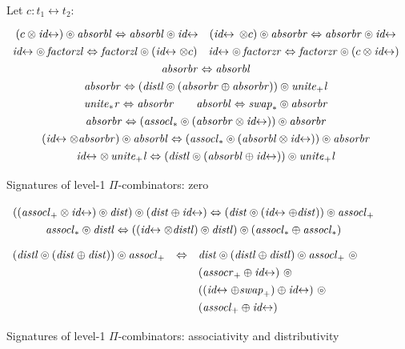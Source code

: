 \documentclass{article}
\newcommand{\identlp}{\mathit{unite}_+\mathit{l}}
\newcommand{\swapp}{\mathit{swap}_+}
\newcommand{\assoclp}{\mathit{assocl}_+}
\newcommand{\assocrp}{\mathit{assocr}_+}
\newcommand{\identlst}{\mathit{unite}_*\mathit{r}}
\newcommand{\swapt}{\mathit{swap}_*}
\newcommand{\assoclt}{\mathit{assocl}_*}
\newcommand{\absorbr}{\mathit{absorbr}}
\newcommand{\absorbl}{\mathit{absorbl}}
\newcommand{\factorzr}{\mathit{factorzr}}
\newcommand{\factorzl}{\mathit{factorzl}}
\newcommand{\dist}{\mathit{dist}}
\newcommand{\distl}{\mathit{distl}}
\newcommand{\idc}{\mathit{id}\!\!\leftrightarrow}
\begin{document}
\begin{figure}[t]
Let $c : t_1 \leftrightarrow t_2$:
\[\def\arraystretch{1.3}
\begin{array}{c}
  {(c \otimes \idc) \circledcirc \absorbl \Leftrightarrow \absorbl \circledcirc \idc}
\quad
  {(\idc \, \otimes c) \circledcirc \absorbr \Leftrightarrow \absorbr \circledcirc \idc}
\\
  {\idc \circledcirc \, \factorzl \Leftrightarrow \factorzl \circledcirc (\idc \otimes c)}
\quad
  {\idc \circledcirc \, \factorzr \Leftrightarrow \factorzr \circledcirc (c \otimes \idc)}
\\
  {\absorbr \Leftrightarrow \absorbl}
\\
  {\absorbr \Leftrightarrow (\distl \circledcirc (\absorbr \oplus \absorbr)) \circledcirc \identlp}
\\
  {\identlst \Leftrightarrow \absorbr}
\qquad
  {\absorbl \Leftrightarrow \swapt \circledcirc \absorbr}
\\
  {\absorbr \Leftrightarrow (\assoclt \circledcirc (\absorbr \otimes \idc)) \circledcirc \absorbr}
\\
  {(\idc \otimes \absorbr) \circledcirc \absorbl \Leftrightarrow (\assoclt \circledcirc (\absorbl \otimes \idc)) \circledcirc \absorbr}
\\
  {\idc \otimes \, \identlp \Leftrightarrow (\distl \circledcirc (\absorbl \oplus \idc)) \circledcirc \identlp}
\end{array}\]
\caption{\label{figc}Signatures of level-1 $\Pi$-combinators: zero}
\end{figure}

\begin{figure}[t]
\[\def\arraystretch{1.3}
\begin{array}{c}
  {((\assoclp \otimes \idc) \circledcirc \dist) \circledcirc (\dist \oplus \idc) \Leftrightarrow (\dist \circledcirc (\idc \oplus \dist)) \circledcirc \assoclp}
\\
  {\assoclt \circledcirc \distl \Leftrightarrow ((\idc \otimes \distl) \circledcirc \distl) \circledcirc (\assoclt \oplus \assoclt)}
\end{array}\]
\vspace{ -0.5em}
\[\def\arraystretch{1.3}
\begin{array}{rcl}
  (\distl \circledcirc (\dist \oplus \dist)) \circledcirc \assoclp &\Leftrightarrow&   
   \dist \circledcirc (\distl \oplus \distl) \circledcirc \assoclp ~\circledcirc \\
&& (\assocrp \oplus \idc) ~\circledcirc \\
&& ((\idc \oplus \swapp) \oplus \idc) ~\circledcirc \\
&&      (\assoclp \oplus \idc)
\end{array}\]
\caption{\label{figb}Signatures of level-1 $\Pi$-combinators: associativity and distributivity}
\end{figure}
\end{document}
